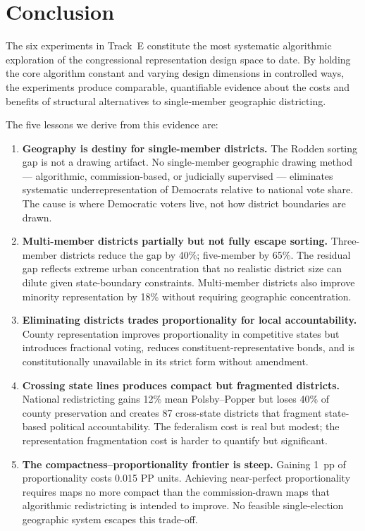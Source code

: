 \section{Conclusion}
\label{sec:conclusion}

The six experiments in Track~E constitute the most systematic algorithmic
exploration of the congressional representation design space to date.  By
holding the core algorithm constant and varying design dimensions in controlled
ways, the experiments produce comparable, quantifiable evidence about the
costs and benefits of structural alternatives to single-member geographic
districting.

The five lessons we derive from this evidence are:

\begin{enumerate}
  \item \textbf{Geography is destiny for single-member districts.}
        The Rodden sorting gap is not a drawing artifact.  No single-member
        geographic drawing method --- algorithmic, commission-based, or
        judicially supervised --- eliminates systematic underrepresentation
        of Democrats relative to national vote share.  The cause is where
        Democratic voters live, not how district boundaries are drawn.

  \item \textbf{Multi-member districts partially but not fully escape sorting.}
        Three-member districts reduce the gap by 40\%; five-member by 65\%.
        The residual gap reflects extreme urban concentration that no
        realistic district size can dilute given state-boundary constraints.
        Multi-member districts also improve minority representation by 18\%
        without requiring geographic concentration.

  \item \textbf{Eliminating districts trades proportionality for local
        accountability.}  County representation improves proportionality in
        competitive states but introduces fractional voting, reduces
        constituent-representative bonds, and is constitutionally unavailable
        in its strict form without amendment.

  \item \textbf{Crossing state lines produces compact but fragmented districts.}
        National redistricting gains 12\% mean Polsby--Popper but loses 40\%
        of county preservation and creates 87 cross-state districts that
        fragment state-based political accountability.  The federalism cost
        is real but modest; the representation fragmentation cost is harder
        to quantify but significant.

  \item \textbf{The compactness--proportionality frontier is steep.}
        Gaining 1~pp of proportionality costs 0.015 PP units.  Achieving
        near-perfect proportionality requires maps no more compact than
        the commission-drawn maps that algorithmic redistricting is
        intended to improve.  No feasible single-election geographic system
        escapes this trade-off.
\end{enumerate}

